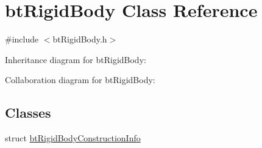 \hypertarget{classbt_rigid_body}{\section{bt\+Rigid\+Body Class Reference}
\label{classbt_rigid_body}
}


{\ttfamily \#include $<$bt\+Rigid\+Body.\+h$>$}



Inheritance diagram for bt\+Rigid\+Body\+:


Collaboration diagram for bt\+Rigid\+Body\+:
\subsection*{Classes}
\begin{DoxyCompactItemize}
\item 
struct \hyperlink{structbt_rigid_body_1_1bt_rigid_body_construction_info}{bt\+Rigid\+Body\+Construction\+Info}
\end{DoxyCompactItemize}
